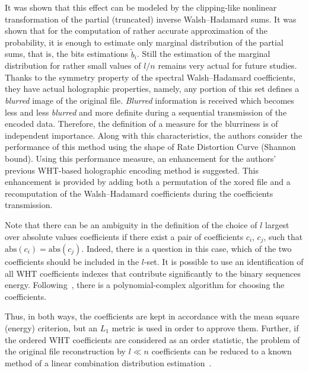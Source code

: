 \begin{multicols}{2}
It was shown that this effect can be modeled by the clipping-like nonlinear transformation 
of the partial (truncated) inverse Walsh--Hadamard sums.
It was shown that for the computation of rather accurate approximation 
of the probability, it is enough to estimate only marginal distribution 
of the partial sums, that is, the bits estimations $\tilde b_i$. Still the 
estimation of the marginal distribution for rather small values of $l/n$ 
remains very actual for future studies.
Thanks to the symmetry property of the spectral Walsh--Hadamard coefficients, 
they have actual holographic properties, namely, any portion of this set
defines a {\em blurred} image of the original file. {\em Blurred} information 
is received which becomes less and less {\em blurred}
and more definite during a sequential transmission of 
the encoded data. Therefore, the definition of a measure for the blurriness 
is of independent importance.
 Along with this characteristics, the authors consider the performance of this method 
 using  the shape of Rate Distortion
Curve (Shannon bound). Using this performance measure,  an enhancement 
for the authors' previous WHT-based holographic encoding method is suggested.
This enhancement is provided by adding both a permutation of the xored file 
and a recomputation of the Walsh--Hadamard coefficients during the coefficients transmission.


Note that there can be an ambiguity in the definition of the choice of $l$ 
largest over absolute values coefficients if there exist a pair of
coefficients $c_i$, $c_j$, such that $\mathrm{abs}\left(c_i\right)=\mathrm{abs}\left(c_j\right)$. Indeed, 
there is a question in this case, which of the two coefficients
should be included in the $l$-set. It is possible to use an 
identification of all WHT coefficients indexes that contribute 
significantly to the binary sequences energy. Following~\cite{6-fr}, 
there is a polynomial-complex algorithm for choosing the coefficients.

Thus, in both ways, the coefficients are kept in accordance with the mean square 
(energy) criterion, but an $L_1$ metric is used in order to approve them. Further, 
if the ordered 
WHT coefficients are considered as an order statistic, the
problem of the original file reconstruction by $l \ll n$ 
coefficients can be reduced to a known method of a linear combination distribution
estimation~\cite{7-fr}.



{\small\frenchspacing
{%
\begin{thebibliography}{9}




\end{thebibliography}}}
\end{multicols}
